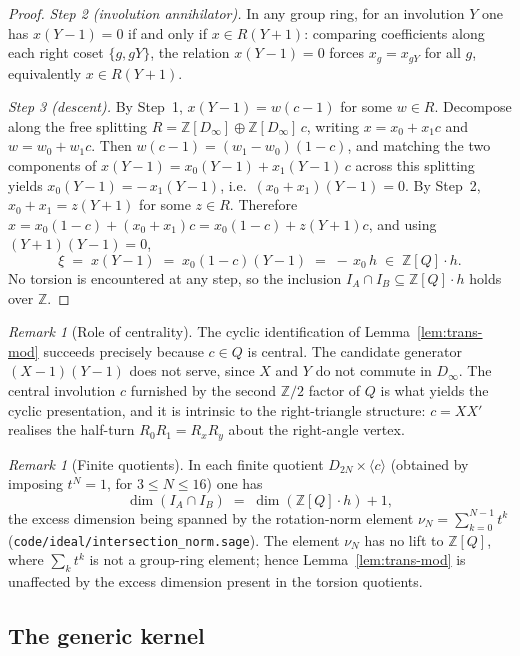 \documentclass[11pt]{article}
\theoremstyle{plain}
\theoremstyle{definition}
\theoremstyle{remark}
\newtheorem{remark}[theorem]{Remark}
\begin{document}
\begin{proof}
\emph{Step 2 (involution annihilator).}  In any group ring, for an
involution $Y$ one has $x(Y-1) = 0$ if and only if $x \in R(Y+1)$:
comparing coefficients along each right coset $\{g, gY\}$, the relation
$x(Y-1) = 0$ forces $x_g = x_{gY}$ for all $g$, equivalently
$x \in R(Y+1)$.

\emph{Step 3 (descent).}  By Step~1, $x(Y-1) = w(c-1)$ for some
$w \in R$.  Decompose along the free splitting
$R = \mathbb{Z}[D_\infty] \oplus \mathbb{Z}[D_\infty]\,c$, writing
$x = x_0 + x_1 c$ and $w = w_0 + w_1 c$.  Then
$w(c-1) = (w_1 - w_0)(1 - c)$, and matching the two components of
$x(Y-1) = x_0(Y-1) + x_1(Y-1)\,c$ across this splitting yields
$x_0(Y-1) = -\,x_1(Y-1)$, i.e.\ $(x_0 + x_1)(Y-1) = 0$.  By Step~2,
$x_0 + x_1 = z(Y+1)$ for some $z \in R$.  Therefore
$x = x_0(1-c) + (x_0 + x_1)c = x_0(1-c) + z(Y+1)c$, and using
$(Y+1)(Y-1) = 0$,
\[
\xi \;=\; x(Y-1) \;=\; x_0(1-c)(Y-1) \;=\; -\,x_0\,h
\;\in\; \mathbb{Z}[Q]\cdot h .
\]
No torsion is encountered at any step, so the inclusion
$I_A \cap I_B \subseteq \mathbb{Z}[Q]\cdot h$ holds over $\mathbb{Z}$.
\end{proof}

\begin{remark}[Role of centrality]
\label{rem:univ-centrality}
The cyclic identification of Lemma~\ref{lem:trans-mod} succeeds
precisely because $c \in Q$ is central.  The candidate generator
$(X-1)(Y-1)$ does not serve, since $X$ and $Y$ do not commute in
$D_\infty$.  The central involution $c$ furnished by the second
$\mathbb{Z}/2$ factor of $Q$ is what yields the cyclic presentation, and
it is intrinsic to the right-triangle structure: $c = XX'$ realises the
half-turn $R_0R_1 = R_xR_y$ about the right-angle vertex.
\end{remark}

\begin{remark}[Finite quotients]
\label{rem:norm-artifact}
In each finite quotient $D_{2N} \times \langle c \rangle$ (obtained by
imposing $t^N = 1$, for $3 \le N \le 16$) one has
\[
\dim(I_A \cap I_B) \;=\; \dim(\mathbb{Z}[Q]\cdot h) + 1,
\]
the excess dimension being spanned by the rotation-norm element
$\nu_N = \sum_{k=0}^{N-1} t^k$
(\texttt{code/ideal/intersection\_norm.sage}).  The element $\nu_N$ has
no lift to $\mathbb{Z}[Q]$, where $\sum_k t^k$ is not a group-ring
element; hence Lemma~\ref{lem:trans-mod} is unaffected by the excess
dimension present in the torsion quotients.
\end{remark}

\subsection{The generic kernel}
\end{document}
